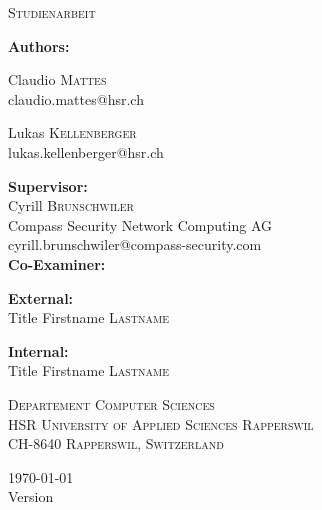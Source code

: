 \begin{titlepage}
	\centering
	\begin{figure}
		\qquad
		\vspace{0.5cm} 	 	
	\end{figure}

	{\scshape\Large Studienarbeit\par}
	\vspace{1.2cm}
	{\huge\bfseries \TITLE\par}
	\vspace{1.2cm}

	{\Large\textbf{Authors:} \\\vspace{0.2cm}}
	{\Large Claudio \textsc{Mattes} \\\small claudio.mattes@hsr.ch \par\vspace{0.2cm}
	\Large Lukas \textsc{Kellenberger} \\\small lukas.kellenberger@hsr.ch}

	\vspace{0.6cm}
	{\Large\textbf{Supervisor:} \\\vspace{0.2cm}}
	Cyrill \textsc{Brunschwiler}  \\ {\small Compass Security Network Computing AG} \\\small cyrill.brunschwiler@compass-security.com \\

	\vspace{0.6cm}
	{\Large\textbf{Co-Examiner:} \\\vspace{0.2cm}}
	{\textbf{External:} \\ Title Firstname \textsc{Lastname}
	 \par\vspace{0.2cm}
	 \textbf{Internal:} \\ Title Firstname \textsc{Lastname} }

	\vfill
	{\scshape\scriptsize Departement Computer Sciences \\ HSR University of Applied Sciences Rapperswil \\ CH-8640 Rapperswil, Switzerland \par}

	\vfill

    {\large \today \\ \small Version \VERSION}
\end{titlepage}